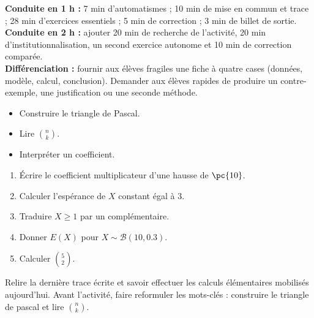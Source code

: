 \ifmxteacher
\begin{method}
\textbf{Conduite en 1 h :} 7 min d'automatismes ; 10 min de mise en commun et trace ; 28 min d'exercices essentiels ; 5 min de correction ; 3 min de billet de sortie.\\
\textbf{Conduite en 2 h :} ajouter 20 min de recherche de l'activité, 20 min d'institutionnalisation, un second exercice autonome et 10 min de correction comparée.\\
\textbf{Différenciation :} fournir aux élèves fragiles une fiche à quatre cases (données, modèle, calcul, conclusion). Demander aux élèves rapides de produire un contre-exemple, une justification ou une seconde méthode.
\end{method}
\fi
{}
\begin{objectives}\begin{itemize}\item Construire le triangle de Pascal.\item Lire $\binom nk$.\item Interpréter un coefficient.\end{itemize}\end{objectives}
\begin{fluency}\begin{enumerate}\item Écrire le coefficient multiplicateur d'une hausse de $\pc{10}$. \item Calculer l'espérance de $X$ constant égal à $3$. \item Traduire $X\geq1$ par un complémentaire. \item Donner $E(X)$ pour $X\sim\mathcal B(10,\num{0,3})$. \item Calculer $\binom52$. \end{enumerate}\end{fluency}
\begin{prerequisites}Relire la dernière trace écrite et savoir effectuer les calculs élémentaires mobilisés aujourd'hui. Avant l'activité, faire reformuler les mots-clés : construire le triangle de pascal et lire $\binom nk$.\end{prerequisites}

